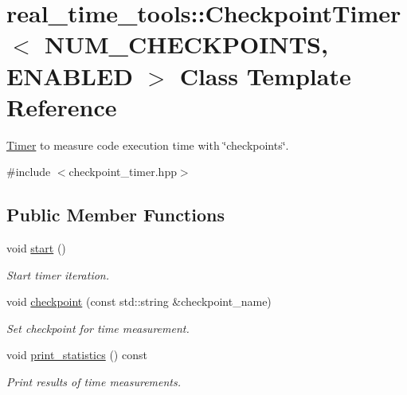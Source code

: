 \hypertarget{classreal__time__tools_1_1CheckpointTimer}{}\section{real\+\_\+time\+\_\+tools\+:\+:Checkpoint\+Timer$<$ N\+U\+M\+\_\+\+C\+H\+E\+C\+K\+P\+O\+I\+N\+TS, E\+N\+A\+B\+L\+ED $>$ Class Template Reference}
\label{classreal__time__tools_1_1CheckpointTimer}


\hyperlink{classreal__time__tools_1_1Timer}{Timer} to measure code execution time with \char`\"{}checkpoints\char`\"{}.  




{\ttfamily \#include $<$checkpoint\+\_\+timer.\+hpp$>$}

\subsection*{Public Member Functions}
\begin{DoxyCompactItemize}
\item 
void \hyperlink{classreal__time__tools_1_1CheckpointTimer_ad93a12cb74103528c8db4e7b1745eae6}{start} ()\hypertarget{classreal__time__tools_1_1CheckpointTimer_ad93a12cb74103528c8db4e7b1745eae6}{}\label{classreal__time__tools_1_1CheckpointTimer_ad93a12cb74103528c8db4e7b1745eae6}

\begin{DoxyCompactList}\small\item\em Start timer iteration. \end{DoxyCompactList}\item 
void \hyperlink{classreal__time__tools_1_1CheckpointTimer_a6e91b61b72c433a220b1bddb7a634bf5}{checkpoint} (const std\+::string \&checkpoint\+\_\+name)
\begin{DoxyCompactList}\small\item\em Set checkpoint for time measurement. \end{DoxyCompactList}\item 
void \hyperlink{classreal__time__tools_1_1CheckpointTimer_acce8c21123fe6f450c8f22de575cfef8}{print\+\_\+statistics} () const \hypertarget{classreal__time__tools_1_1CheckpointTimer_acce8c21123fe6f450c8f22de575cfef8}{}\label{classreal__time__tools_1_1CheckpointTimer_acce8c21123fe6f450c8f22de575cfef8}

\begin{DoxyCompactList}\small\item\em Print results of time measurements. \end{DoxyCompactList}\end{DoxyCompactItemize}
